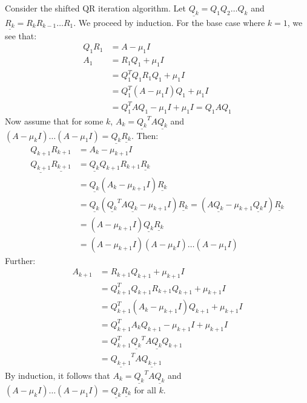 \documentclass{article}
\begin{document}
\clearpage
\problem{}
Consider the shifted QR iteration algorithm. Let $\underline{Q_k} = Q_1Q_2 \ldots Q_k$ and $\underline{R_k} = R_kR_{k-1} \ldots R_1$. We proceed by induction. For the base case where $k = 1$, we see that:
\begin{align*}
    Q_1R_1 & = A - \mu_1 I \\
    A_1 & = R_1Q_1 + \mu_1 I \\
    & = Q_1^TQ_1R_1Q_1 + \mu_1 I \\
    & = Q_1^T(A - \mu_1 I)Q_1 + \mu_1 I \\
    & = Q_1^TAQ_1 - \mu_1 I + \mu_1 I = Q_1AQ_1
\end{align*}
Now assume that for some $k$, $A_k = \underline{Q_k}^TA\underline{Q_k}$ and $(A - \mu_k I) \ldots (A - \mu_1 I) = \underline{Q_k}\underline{R_k}$. Then:
\begin{align*}
    Q_{k+1}R_{k+1} & = A_k - \mu_{k+1}I \\
    \underline{Q_{k+1}}\underline{R_{k+1}} & = \underline{Q_k}Q_{k+1}R_{k+1}\underline{R_k} \\
    & = \underline{Q_k}(A_k - \mu_{k+1}I)\underline{R_k} \\
    & = \underline{Q_k}(\underline{Q_k}^TA\underline{Q_k} - \mu_{k+1}I)\underline{R_k} = (A\underline{Q_k} - \mu_{k+1}\underline{Q_k}I)\underline{R_k} \\
    & = (A - \mu_{k+1}I)\underline{Q_k}\underline{R_k} \\
    & = (A - \mu_{k+1} I)(A - \mu_k I) \ldots (A - \mu_1 I)
\end{align*}
Further:
\begin{align*}
    A_{k+1} & = R_{k+1}Q_{k+1} + \mu_{k+1} I \\
    & = Q_{k+1}^TQ_{k+1}R_{k+1}Q_{k+1} + \mu_{k+1} I \\
    & = Q_{k+1}^T(A_k - \mu_{k+1}I)Q_{k+1} + \mu_{k+1} I \\
    & = Q_{k+1}^TA_kQ_{k+1} - \mu_{k+1}I + \mu_{k+1} I \\
    & = Q_{k+1}^T\underline{Q_k}^TA\underline{Q_k}Q_{k+1} \\
    & = \underline{Q_{k+1}}^TA\underline{Q_{k+1}}
\end{align*}
By induction, it follows that $A_k = \underline{Q_k}^TA\underline{Q_k}$ and $(A - \mu_k I) \ldots (A - \mu_1 I) = \underline{Q_k}\underline{R_k}$ for all $k$.
\end{document}
